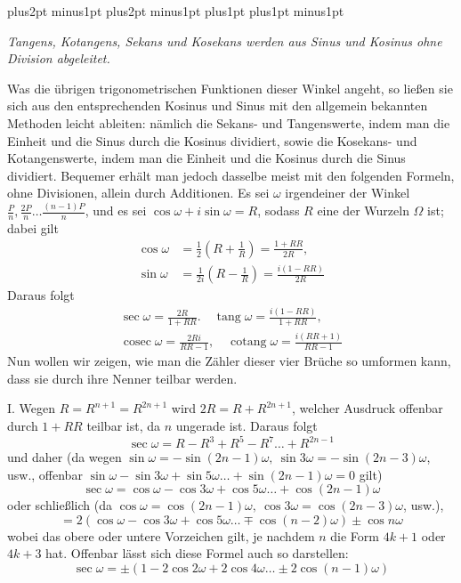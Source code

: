 \clearpage
\begingroup\abovedisplayskip=6pt plus2pt minus1pt \belowdisplayskip=6pt plus2pt minus1pt \abovedisplayshortskip=0pt plus1pt \belowdisplayshortskip=3pt plus1pt minus1pt
\begin{center}\itshape \textit{Tangens, Kotangens, Sekans und Kosekans werden aus Sinus und Kosinus ohne Division abgeleitet.}\end{center}


Was die übrigen trigonometrischen Funktionen dieser Winkel angeht, so ließen sie sich aus den entsprechenden Kosinus und Sinus mit den allgemein bekannten Methoden leicht ableiten: nämlich die Sekans- und Tangenswerte, indem man die Einheit und die Sinus durch die Kosinus dividiert, sowie die Kosekans- und Kotangenswerte, indem man die Einheit und die Kosinus durch die Sinus dividiert. Bequemer erhält man jedoch dasselbe meist mit den folgenden Formeln, ohne Divisionen, allein durch Additionen. Es sei \(\omega\) irgendeiner der Winkel \(\frac Pn,\allowbreak \frac{2P}n\ldots\frac{(n-1)P}n\), und es sei \(\cos\omega+i\sin\omega=R\), sodass \(R\) eine der Wurzeln \(\Omega\) ist; dabei gilt \[\begin{aligned}\cos\omega&=\tfrac12(R+\tfrac1R)=\frac{1+RR}{2R},\\\sin\omega&=\tfrac1{2i}(R-\tfrac1R)=\frac{i(1-RR)}{2R}\end{aligned}\] Daraus folgt \[\begin{gathered}\sec\omega=\frac{2R}{1+RR}.\quad\operatorname{tang}\omega=\frac{i(1-RR)}{1+RR},\\\operatorname{cosec}\omega=\frac{2Ri}{RR-1},\quad\operatorname{cotang}\omega=\frac{i(RR+1)}{RR-1}\end{gathered}\] Nun wollen wir zeigen, wie man die Zähler dieser vier Brüche so umformen kann, dass sie durch ihre Nenner teilbar werden.

I. Wegen \(R=R^{n+1}=R^{2n+1}\) wird \(2R=R+R^{2n+1}\), welcher Ausdruck offenbar durch \(1+RR\) teilbar ist, da \(n\) ungerade ist. Daraus folgt \[\sec\omega=R-R^3+R^5-R^7\ldots+R^{2n-1}\] und daher (da wegen \(\sin\omega=-\sin(2n-1)\omega,\allowbreak \ \sin3\omega=-\sin(2n-3)\omega\), usw., offenbar \(\sin\omega-\sin3\omega+\sin5\omega\ldots+\sin(2n-1)\omega=0\) gilt) \[\sec\omega=\cos\omega-\cos3\omega+\cos5\omega\ldots+\cos(2n-1)\omega\] oder schließlich (da \(\cos\omega=\cos(2n-1)\omega,\allowbreak \ \cos3\omega=\cos(2n-3)\omega\), usw.), \[=2(\cos\omega-\cos3\omega+\cos5\omega\ldots\mp\cos(n-2)\omega)\pm\cos n\omega\] wobei das obere oder untere Vorzeichen gilt, je nachdem \(n\) die Form \(4k+1\) oder \(4k+3\) hat. Offenbar lässt sich diese Formel auch so darstellen: \[\sec\omega=\pm(1-2\cos2\omega+2\cos4\omega\ldots\pm2\cos(n-1)\omega)\]

